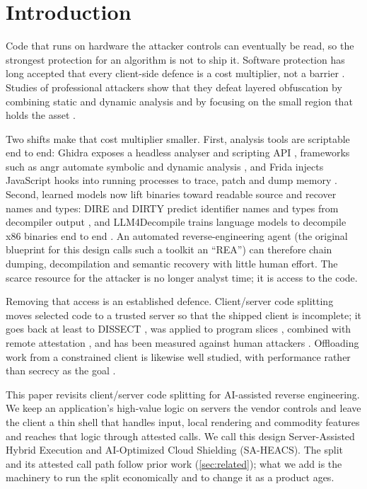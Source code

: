 \section{Introduction}\label{sec:intro}

Code that runs on hardware the attacker controls can eventually be read, so the strongest
protection for an algorithm is not to ship it. Software protection has long accepted that
every client-side defence is a cost multiplier, not a barrier
\cite{collberg1997taxonomy,collberg2002watermarking,schrittwieser2016obfuscation}. Studies of
professional attackers show that they defeat layered obfuscation by combining static and
dynamic analysis and by focusing on the small region that holds the asset
\cite{ceccato2017hackers}.

Two shifts make that cost multiplier smaller. First, analysis tools are scriptable end to
end: Ghidra exposes a headless analyser and scripting API \cite{nsa2019ghidra}, frameworks
such as angr automate symbolic and dynamic analysis \cite{shoshitaishvili2016sok}, and Frida
injects JavaScript hooks into running processes to trace, patch and dump memory
\cite{frida}. Second, learned models now lift binaries toward readable source and recover
names and types: DIRE and DIRTY predict identifier names and types from decompiler output
\cite{lacomis2019dire,chen2022dirty}, and LLM4Decompile trains language models to decompile
x86 binaries end to end \cite{tan2024llm4decompile}. An automated reverse-engineering agent
(the original blueprint for this design calls such a toolkit an \enquote{REA}) can therefore chain
dumping, decompilation and semantic recovery with little human effort. The scarce resource
for the attacker is no longer analyst time; it is access to the code.

Removing that access is an established defence. Client/server code splitting moves selected
code to a trusted server so that the shipped client is incomplete; it goes back at least to
DISSECT \cite{valdez2001dissect}, was applied to program slices \cite{zhang2003hiding},
combined with remote attestation \cite{viticchie2016reactive}, and has been measured against
human attackers \cite{viticchie_ese_splitting}. Offloading work from a constrained client is
likewise well studied, with performance rather than secrecy as the goal
\cite{cuervo2010maui,chun2011clonecloud,kang2017neurosurgeon}.

This paper revisits client/server code splitting for AI-assisted reverse engineering. We
keep an application's high-value logic on servers the vendor controls and leave the client
a thin shell that handles input, local rendering and commodity features and reaches that
logic through attested calls. We call this design Server-Assisted Hybrid Execution and
AI-Optimized Cloud Shielding (SA-HEACS). The split and its attested call path follow prior
work (\cref{sec:related}); what we add is the machinery to run the split economically and
to change it as a product ages.


